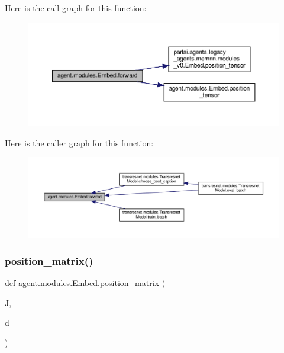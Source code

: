 Here is the call graph for this function\+:
\nopagebreak
\begin{figure}[H]
\begin{center}
\leavevmode
\includegraphics[width=350pt]{classagent_1_1modules_1_1Embed_aecd5510c339a8fd238d56226863dcb81_cgraph}
\end{center}
\end{figure}
Here is the caller graph for this function\+:
\nopagebreak
\begin{figure}[H]
\begin{center}
\leavevmode
\includegraphics[width=350pt]{classagent_1_1modules_1_1Embed_aecd5510c339a8fd238d56226863dcb81_icgraph}
\end{center}
\end{figure}
\mbox{\label{classagent_1_1modules_1_1Embed_a5efae3b0a1994436b49124274cfc089f}} 
\subsubsection{\texorpdfstring{position\+\_\+matrix()}{position\_matrix()}}
{\footnotesize\ttfamily def agent.\+modules.\+Embed.\+position\+\_\+matrix (\begin{DoxyParamCaption}\item[{}]{J,  }\item[{}]{d }\end{DoxyParamCaption})}



